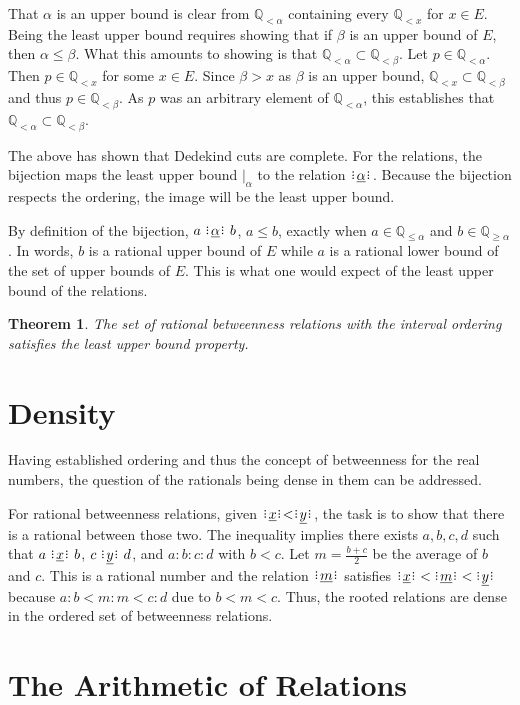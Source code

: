 \documentclass[12pt]{article}
\newtheorem{theorem}{Theorem}
\newcommand{\qcut}[2][x]{\ensuremath{\mathbb{Q}_{#2 #1}}}
\newcommand{\qlt}[1][x]{\qcut[#1]{<}}
\newcommand{\qgeq}[1][x]{\qcut[#1]{\geq}}
\newcommand{\qleq}[1][x]{\qcut[#1]{\leq}}
\newcommand{\cut}[1][x]{{\vert}_{#1} }
\newcommand{\yrel}{\xrel[y]}
\begin{document}
That $\alpha$ is an upper bound is clear from $\qlt[\alpha]$ containing every $\qlt$ for $x \in E$. Being the least upper bound requires showing that if $\beta$ is an upper bound of $E$, then $\alpha \leq \beta$. What this amounts to showing is that $\qlt[\alpha] \subset \qlt[\beta]$. Let $p \in \qlt[\alpha]$. Then $p \in \qlt$ for some $x \in E$. Since $\beta > x$ as $\beta$ is an upper bound, $\qlt \subset \qlt[\beta]$ and thus $p \in \qlt[\beta]$. As $p$ was an arbitrary element of $\qlt[\alpha]$, this  establishes that $\qlt[\alpha] \subset \qlt[\beta]$.

The above has shown that Dedekind cuts are complete. For the relations, the bijection  maps the least upper bound $\cut[\alpha]$ to the relation $\xrel[\alpha]$. Because the bijection respects the ordering, the image will be the least upper bound. 

By definition of the bijection, $a \xrel[\alpha] b$, $a \leq b$, exactly when $a \in \qleq [\alpha]$ and $b \in \qgeq[\alpha]$. In words, $b$ is a rational upper bound of $E$ while $a$ is a rational lower bound of the set of upper bounds of $E$. This is what one would expect of the least upper bound of the relations. 

\begin{theorem}
    The set of rational betweenness relations with the interval ordering satisfies the least upper bound property. 
\end{theorem}

\section{Density}

Having established ordering and thus the concept of betweenness for the real numbers, the question of the rationals being dense in them can be addressed.

For rational betweenness relations, given $\xrel < \yrel$, the task is to show that there is a rational between those two. The inequality implies there exists $a,b,c,d$ such that $a \xrel b$, $c \xrel[y] d$, and $a:b:c:d$ with $b < c$. Let $m = \frac{b+c}{2}$ be the average of $b$ and $c$. This is a rational number and the relation $\xrel[m]$ satisfies $\xrel  \:<\: \xrel[m]  \:<\: \xrel[y]$ because $a:b < m:m < c:d$ due to $b < m < c$. Thus, the rooted relations are dense in the ordered set of betweenness relations. 
 


\section{The Arithmetic of Relations}
\end{document}
